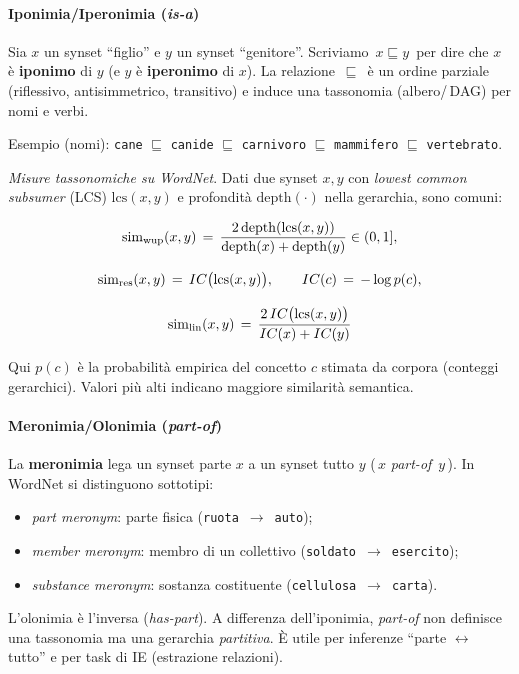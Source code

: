             \paragraph{Iponimia/Iperonimia (\emph{is\!-a})}
            Sia $x$ un synset “figlio” e $y$ un synset “genitore”. Scriviamo \,$x\sqsubseteq y$\, per dire che $x$ è \textbf{iponimo} di $y$ (e $y$ è \textbf{iperonimo} di $x$). La relazione \,$\sqsubseteq$\, è un ordine parziale (riflessivo, antisimmetrico, transitivo) e induce una tassonomia (albero/\,DAG) per nomi e verbi.
            
            Esempio (nomi): \;\texttt{cane} $\sqsubseteq$ \texttt{canide} $\sqsubseteq$ \texttt{carnivoro} $\sqsubseteq$ \texttt{mammifero} $\sqsubseteq$ \texttt{vertebrato}.
            
            \emph{Misure tassonomiche su WordNet}. Dati due synset $x,y$ con \emph{lowest common subsumer} (LCS) $\mathrm{lcs}(x,y)$ e profondità $\mathrm{depth}(\cdot)$ nella gerarchia, sono comuni:
            
            \begin{gather}
            \notag
            \mathrm{sim}_{\mathrm{wup}}(x,y) \,=\, \frac{2\,\mathrm{depth}(\mathrm{lcs}(x,y))}{\mathrm{depth}(x)+\mathrm{depth}(y)} \in (0,1],\\[2ex]
            \notag
            \mathrm{sim}_{\mathrm{res}}(x,y) \,=\, IC\big(\mathrm{lcs}(x,y)\big),\qquad IC(c)\,=\,-\log p(c),\\[2ex]
            \notag
            \mathrm{sim}_{\mathrm{lin}}(x,y) \,=\, \frac{2\,IC\big(\mathrm{lcs}(x,y)\big)}{IC(x)+IC(y)}
            \end{gather}
            
            Qui $p(c)$ è la probabilità empirica del concetto $c$ stimata da corpora (conteggi gerarchici). Valori più alti indicano maggiore similarità semantica.
            
            \paragraph{Meronimia/Olonimia (\emph{part\!-of})}
            La \textbf{meronimia} lega un synset parte $x$ a un synset tutto $y$ (\,$x$ \emph{part-of} \,$y$\,). In WordNet si distinguono sottotipi:
            \begin{itemize}
              \item \textit{part meronym}: parte fisica (\texttt{ruota} \,$\to$\, \texttt{auto});
              \item \textit{member meronym}: membro di un collettivo (\texttt{soldato} \,$\to$\, \texttt{esercito});
              \item \textit{substance meronym}: sostanza costituente (\texttt{cellulosa} \,$\to$\, \texttt{carta}).
            \end{itemize}
            L'olonimia è l'inversa (\emph{has\!-part}). A differenza dell'iponimia, \emph{part\!-of} non definisce una tassonomia ma una gerarchia \emph{partitiva}. È utile per inferenze “parte\,\,$\leftrightarrow$\,tutto” e per task di IE (estrazione relazioni).
            
